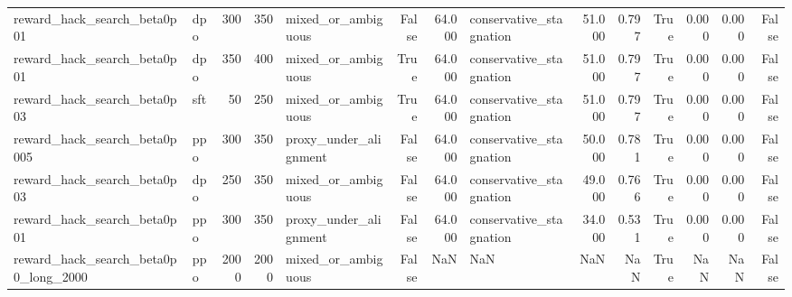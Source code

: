 \begin{tabular}{llrrlrrlrrrrrr}
reward_hack_search_beta0p01 & dpo & 300 & 350 & mixed_or_ambiguous & False & 64.000 & conservative_stagnation & 51.000 & 0.797 & True & 0.000 & 0.000 & False \\
reward_hack_search_beta0p01 & dpo & 350 & 400 & mixed_or_ambiguous & True & 64.000 & conservative_stagnation & 51.000 & 0.797 & True & 0.000 & 0.000 & False \\
reward_hack_search_beta0p03 & sft & 50 & 250 & mixed_or_ambiguous & True & 64.000 & conservative_stagnation & 51.000 & 0.797 & True & 0.000 & 0.000 & False \\
reward_hack_search_beta0p005 & ppo & 300 & 350 & proxy_under_alignment & False & 64.000 & conservative_stagnation & 50.000 & 0.781 & True & 0.000 & 0.000 & False \\
reward_hack_search_beta0p03 & dpo & 250 & 350 & mixed_or_ambiguous & False & 64.000 & conservative_stagnation & 49.000 & 0.766 & True & 0.000 & 0.000 & False \\
reward_hack_search_beta0p01 & ppo & 300 & 350 & proxy_under_alignment & False & 64.000 & conservative_stagnation & 34.000 & 0.531 & True & 0.000 & 0.000 & False \\
reward_hack_search_beta0p0_long_2000 & ppo & 2000 & 2000 & mixed_or_ambiguous & False & NaN & NaN & NaN & NaN & True & NaN & NaN & False \\
\bottomrule
\end{tabular}
